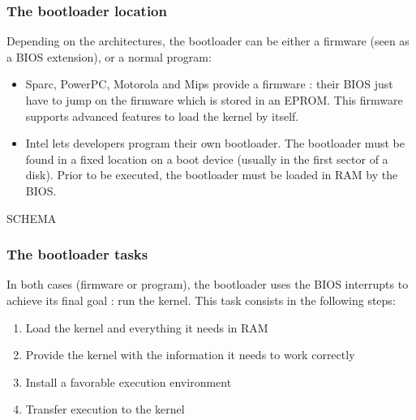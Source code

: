 %
%
%

\begin{frame}
  \frametitle{The bootloader location}

  Depending on the architectures, the bootloader can be either a firmware (seen as a BIOS extension), or a normal program:

  \-

  \begin{itemize}
  \item Sparc, PowerPC, Motorola and Mips provide a firmware : their BIOS just have to jump on the firmware which is stored in an EPROM. This firmware supports advanced features to load the kernel by itself.

  \-

  \item Intel lets developers program their own bootloader. The bootloader must be found in a fixed location on a boot device (usually in the first sector of a disk). Prior to be executed, the bootloader must be loaded in RAM by the BIOS.
  \end{itemize}

  \-

  SCHEMA

\end{frame}

%
%
%

\begin{frame}
  \frametitle{The bootloader tasks}

  In both cases (firmware or program), the bootloader uses the BIOS interrupts to achieve its final goal : run the kernel. This task consists in the following steps:

  \-

  \begin{enumerate}
  \item Load the kernel and everything it needs in RAM
  \item Provide the kernel with the information it needs to work correctly
  \item Install a favorable execution environment
  \item Transfer execution to the kernel
  \end{enumerate}

\end{frame}

%
%
%

%
%

